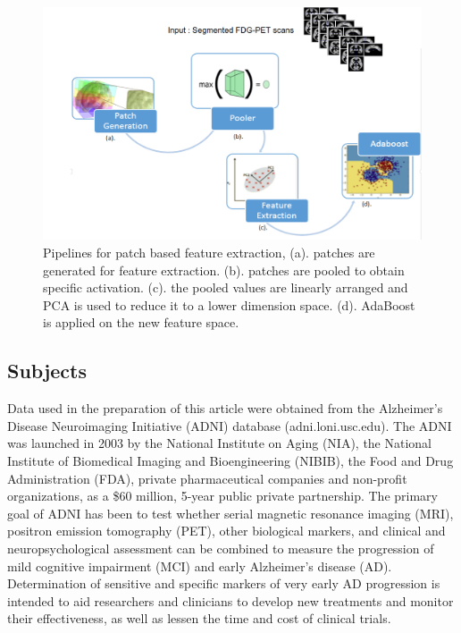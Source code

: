 \documentclass[authoryear,preprint,revi	ew,12pt]{elsarticle}
\begin{document}
\begin{figure}
	\centering
	\includegraphics[width=\linewidth]{figures/pipeline2.png}
	\caption[Pipelines for Patch based Feature Extraction]{Pipelines for patch based feature extraction, (a). patches are generated for feature extraction. (b). patches are pooled to obtain specific activation. (c). the pooled values are linearly arranged and PCA is used to reduce it to a lower dimension space. (d). AdaBoost is applied on the new feature space.}
	\label{fig:pipeline}
\end{figure}

\subsection{Subjects}
\label{sec:subjects}
Data used in the preparation of this article were obtained from the Alzheimer\textquoteright s Disease Neuroimaging Initiative (ADNI) database (adni.loni.usc.edu). The ADNI was launched in 2003 by the National Institute on Aging (NIA), the National Institute of Biomedical Imaging and Bioengineering (NIBIB), the Food and Drug Administration (FDA), private pharmaceutical companies and non-profit organizations, as a \$60 million, 5-year public private partnership. The primary goal of ADNI has been to test whether serial magnetic resonance imaging (MRI), positron emission tomography (PET), other biological markers, and clinical and neuropsychological assessment can be combined to measure the progression of mild cognitive impairment (MCI) and early Alzheimer\textquoteright s disease (AD). Determination of sensitive and specific markers of very early AD progression is intended to aid researchers and clinicians to develop new treatments and monitor their effectiveness, as well as lessen the time and cost of clinical trials.
\end{document}
